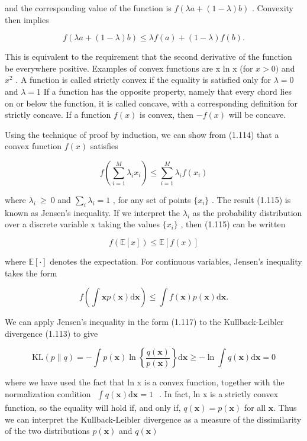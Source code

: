 \documentclass[
  10
]{article}
\begin{document}
and the corresponding value of the function is
\(f \left( \lambda a + ( 1 - \lambda ) b \right)\) . Convexity then
implies

\[
f (\lambda a + (1 - \lambda) b) \leqslant \lambda f (a) + (1 - \lambda) f (b).\tag{1.114}
\]

This is equivalent to the requirement that the second derivative of the
function be everywhere positive. Examples of convex functions are x ln x
(for \(x > 0 )\) and \(x ^ { 2 }\) . A function is called strictly
convex if the equality is satisfied only for \(\lambda = 0\) and
\(\lambda = 1\) If a function has the opposite property, namely that
every chord lies on or below the function, it is called concave, with a
corresponding definition for strictly concave. If a function \(f ( x )\)
is convex, then \(- f ( x )\) will be concave.

Using the technique of proof by induction, we can show from (1.114) that
a convex function \(f ( x )\) satisfies

\[
f \left(\sum_ {i = 1} ^ {M} \lambda_ {i} x _ {i}\right) \leqslant \sum_ {i = 1} ^ {M} \lambda_ {i} f (x _ {i})\tag{1.115}
\]

where \(\lambda _ { i } ~ \geqslant ~ 0\) and
\(\textstyle \sum _ { i } \lambda _ { i } = 1\) , for any set of points
\(\{ x _ { i } \}\) . The result (1.115) is known as Jensen's
inequality. If we interpret the \(\lambda _ { i }\) as the probability
distribution over a discrete variable x taking the values
\(\{ x _ { i } \}\) , then (1.115) can be written

\[
f \left(\mathbb {E} [ x ]\right) \leqslant \mathbb {E} [ f (x) ]\tag{1.116}
\]

where \(\mathbb { E } [ \cdot ]\) denotes the expectation. For
continuous variables, Jensen's inequality takes the form

\[
f \left(\int \mathbf {x} p (\mathbf {x}) \mathrm{d} \mathbf {x}\right) \leqslant \int f (\mathbf {x}) p (\mathbf {x}) \mathrm{d} \mathbf {x}.\tag{1.117}
\]

We can apply Jensen's inequality in the form (1.117) to the
Kullback-Leibler divergence (1.113) to give

\[
\mathrm{KL} (p \| q) = - \int p (\mathbf {x}) \ln \left\{\frac {q (\mathbf {x})}{p (\mathbf {x})} \right\} \mathrm{d} \mathbf {x} \geqslant - \ln \int q (\mathbf {x}) \mathrm{d} \mathbf {x} = 0\tag{1.118}
\]

where we have used the fact that ln x is a convex function, together
with the normalization condition
\(\begin{array} { r } { \int q ( \mathbf { x } ) \mathrm { d } \mathbf { x } = 1 } \end{array}\)
. In fact, ln x is a strictly convex function, so the equality will hold
if, and only if, \(q ( \mathbf { x } ) = p ( \mathbf { x } )\) for all
\(\mathbf { x } .\) Thus we can interpret the Kullback-Leibler
divergence as a measure of the dissimilarity of the two distributions
\(p ( \mathbf { x } )\) and \(q ( \mathbf { x } )\)
\end{document}

